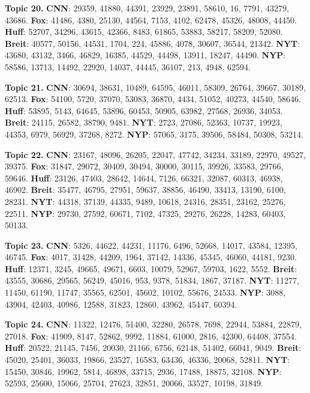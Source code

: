 \documentclass[11pt]{article}
\begin{document}
\textbf{Topic 20.}
\textbf{CNN}: 29359, 41880, 44391, 23929, 23891, 58610, 16, 7791, 43279, 43686.
\textbf{Fox}: 41486, 4380, 25130, 44564, 7153, 4102, 62478, 45326, 48008, 44450.
\textbf{Huff}: 52707, 34296, 43615, 42366, 8483, 61865, 53883, 58217, 58209, 52080.
\textbf{Breit}: 40577, 50156, 44531, 1704, 224, 45886, 4078, 30607, 36544, 21342.
\textbf{NYT}: 43680, 43132, 3466, 46829, 16385, 44529, 44498, 13911, 18247, 44490.
\textbf{NYP}: 58586, 13713, 14492, 22920, 14037, 44445, 36107, 213, 4948, 62594.


\textbf{Topic 21.}
\textbf{CNN}: 30694, 38631, 10489, 64595, 46011, 58309, 26764, 39667, 30189, 62513.
\textbf{Fox}: 54100, 5720, 37070, 53083, 36870, 4434, 51052, 40273, 44540, 58646.
\textbf{Huff}: 53895, 5143, 64645, 53896, 60453, 50905, 63982, 27568, 26936, 34053.
\textbf{Breit}: 24115, 26582, 38790, 9481.
\textbf{NYT}: 2723, 27086, 52363, 10737, 19923, 44353, 6979, 56929, 37268, 8272.
\textbf{NYP}: 57065, 3175, 39506, 58484, 50308, 53214.


\textbf{Topic 22.}
\textbf{CNN}: 23167, 48096, 26205, 22047, 47742, 34234, 33189, 22970, 49527, 39375.
\textbf{Fox}: 31847, 29072, 30409, 30494, 30000, 30115, 39926, 33583, 29766, 59646.
\textbf{Huff}: 23126, 47403, 28642, 14644, 7126, 66321, 32087, 60313, 46938, 46902.
\textbf{Breit}: 35477, 46795, 27951, 59637, 38856, 46490, 33413, 13190, 6100, 28231.
\textbf{NYT}: 44318, 37139, 44335, 9489, 10618, 24316, 28351, 23162, 25276, 22511.
\textbf{NYP}: 29730, 27592, 60671, 7102, 47325, 29276, 26228, 14283, 60403, 50133.



\textbf{Topic 23.}
\textbf{CNN}: 5326, 44622, 44231, 11176, 6496, 52668, 14017, 43584, 12395, 46745.
\textbf{Fox}: 4017, 31428, 44209, 1964, 37142, 14336, 45345, 46060, 44181, 9230.
\textbf{Huff}: 12371, 3245, 49665, 49671, 6603, 10079, 52967, 59703, 1622, 5552.
\textbf{Breit}: 43555, 30686, 29565, 56249, 45016, 953, 9378, 51834, 1867, 37187.
\textbf{NYT}: 11277, 11450, 61190, 11747, 35565, 62501, 45602, 10102, 55676, 24533.
\textbf{NYP}: 3088, 43904, 42403, 40986, 12588, 31823, 12860, 43962, 45447, 60394.



\textbf{Topic 24.}
\textbf{CNN}: 11322, 12476, 51400, 32280, 26578, 7698, 22944, 53884, 22879, 27018.
\textbf{Fox}: 41909, 8147, 52862, 9992, 11884, 61000, 2816, 42300, 64408, 37554.
\textbf{Huff}: 20522, 21145, 7456, 20030, 21166, 6756, 62148, 51402, 66041, 9049.
\textbf{Breit}: 45020, 25401, 36033, 19866, 23527, 16583, 63436, 46336, 20068, 52811.
\textbf{NYT}: 15450, 30846, 19962, 5814, 46898, 33715, 2936, 17488, 18875, 32108.
\textbf{NYP}: 52593, 25600, 15066, 25704, 27623, 32851, 20066, 33527, 10198, 31849.
\end{document}
